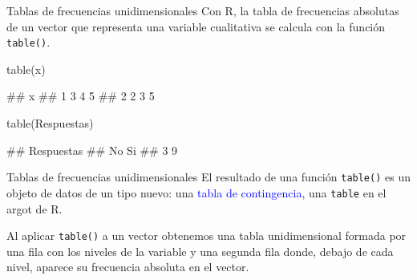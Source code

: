 \documentclass[
  ignorenonframetext,
  aspectratio=169]{beamer}
\newenvironment{Shaded}{\begin{snugshade}}{\end{snugshade}}
\newcommand{\FunctionTok}[1]{\textcolor[rgb]{0.00,0.00,0.00}{#1}}
\newcommand{\NormalTok}[1]{#1}
\let\oldverbatim\verbatim
\let\endoldverbatim\endverbatim
\renewenvironment{verbatim}{\tiny\oldverbatim}{\endoldverbatim}
\newcommand\blue[1]{\textcolor{blue}{#1}}
\begin{document}
\begin{frame}[fragile]{Tablas de frecuencias unidimensionales}
\protect\hypertarget{tablas-de-frecuencias-unidimensionales-1}{}
Con R, la tabla de frecuencias absolutas de un vector que representa una
variable cualitativa se calcula con la función \texttt{table()}.

\begin{Shaded}
\begin{Highlighting}[]
\FunctionTok{table}\NormalTok{(x)}
\end{Highlighting}
\end{Shaded}

\begin{verbatim}
## x
## 1 3 4 5 
## 2 2 3 5
\end{verbatim}

\begin{Shaded}
\begin{Highlighting}[]
\FunctionTok{table}\NormalTok{(Respuestas)}
\end{Highlighting}
\end{Shaded}

\begin{verbatim}
## Respuestas
## No Si 
##  3  9
\end{verbatim}
\end{frame}

\begin{frame}[fragile]{Tablas de frecuencias unidimensionales}
\protect\hypertarget{tablas-de-frecuencias-unidimensionales-2}{}
El resultado de una función \texttt{table()} es un objeto de datos de un
tipo nuevo: una \blue{tabla de contingencia}, una \texttt{table} en el
argot de R.

Al aplicar \texttt{table()} a un vector obtenemos una tabla
unidimensional formada por una fila con los niveles de la variable y una
segunda fila donde, debajo de cada nivel, aparece su frecuencia absoluta
en el vector.
\end{frame}
\end{document}
